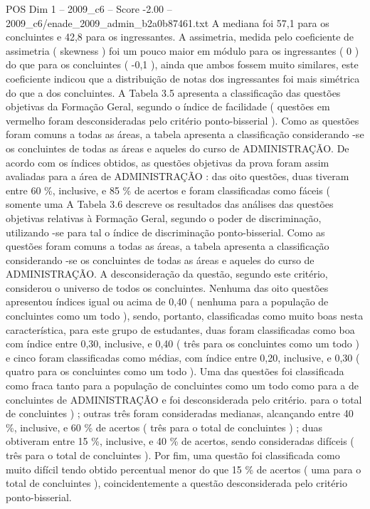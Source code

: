 \begin{textsample}{POS Dim 1 – 2009\_c6 – Score -2.00 – 2009\_c6/enade\_2009\_admin\_b2a0b87461.txt}
A mediana foi 57,1 para os concluintes e 42,8 para os ingressantes.
A assimetria, medida pelo coeficiente de assimetria ( skewness ) foi um pouco maior em módulo para os ingressantes ( 0 ) do que para os concluintes ( -0,1 ), ainda que ambos fossem muito similares, este coeficiente indicou que a distribuição de notas dos ingressantes foi mais simétrica do que a dos concluintes.
A Tabela 3.5 apresenta a classificação das questões objetivas da Formação Geral, segundo o índice de facilidade ( questões em vermelho foram desconsideradas pelo critério ponto-bisserial ).
Como as questões foram comuns a todas as áreas, a tabela apresenta a classificação considerando -se os concluintes de todas as áreas e aqueles do curso de ADMINISTRAÇÃO.
De acordo com os índices obtidos, as questões objetivas da prova foram assim avaliadas para a área de ADMINISTRAÇÃO : das oito questões, duas tiveram entre 60 \%, inclusive, e 85 \% de acertos e foram classificadas como fáceis ( somente uma A Tabela 3.6 descreve os resultados das análises das questões objetivas relativas à Formação Geral, segundo o poder de discriminação, utilizando -se para tal o índice de discriminação ponto-bisserial.
Como as questões foram comuns a todas as áreas, a tabela apresenta a classificação considerando -se os concluintes de todas as áreas e aqueles do curso de ADMINISTRAÇÃO.
A desconsideração da questão, segundo este critério, considerou o universo de todos os concluintes.
Nenhuma das oito questões apresentou índices igual ou acima de 0,40 ( nenhuma para a população de concluintes como um todo ), sendo, portanto, classificadas como muito boas nesta característica, para este grupo de estudantes, duas foram classificadas como boa com índice entre 0,30, inclusive, e 0,40 ( três para os concluintes como um todo ) e cinco foram classificadas como médias, com índice entre 0,20, inclusive, e 0,30 ( quatro para os concluintes como um todo ).
Uma das questões foi classificada como fraca tanto para a população de concluintes como um todo como para a de concluintes de ADMINISTRAÇÃO e foi desconsiderada pelo critério. para o total de concluintes ) ; outras três foram consideradas medianas, alcançando entre 40 \%, inclusive, e 60 \% de acertos ( três para o total de concluintes ) ; duas obtiveram entre 15 \%, inclusive, e 40 \% de acertos, sendo consideradas difíceis ( três para o total de concluintes ).
Por fim, uma questão foi classificada como muito difícil tendo obtido percentual menor do que 15 \% de acertos ( uma para o total de concluintes ), coincidentemente a questão desconsiderada pelo critério ponto-bisserial.

\end{textsample}
